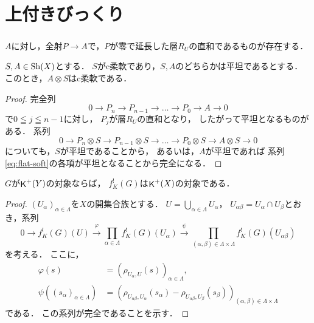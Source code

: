 \section{上付きびっくり}
\subparagraph{\cite[V, 6.1]{B+84}}
\(A\)に対し，全射\(P\to{A}\)で，\(P\)が零で延長した層\(R_U\)の直和であるものが存在する．
\begin{LMM}\cite[{V. Proposition 6.5}]{B+84}
    \(S,A\in\mathrm{Sh}(X)\)とする．
    \(S\)がc柔軟であり，\(S,A\)のどちらかは平坦であるとする．
    このとき，\(A\otimes S\)はc柔軟である．
\end{LMM}
\begin{proof}
    完全列\begin{equation}\label{eq:flat-soft}
        0\to{P_{n}}\to{P_{n-1}}\to\dots\to{P_{0}}\to{A}\to0
    \end{equation}
    で\(0\leqq{j}\leqq{n-1}\)に対し，
    \({P_{j}}\)が層\(R_U\)の直和となり，
    したがって平坦となるものがある．
    系列
    \begin{equation}
        0\to{P_{n}}\otimes{S}\to{P_{n-1}}\otimes{S}
        \to\dots\to{P_{0}}\otimes{S}\to{A}\otimes{S}\to0
    \end{equation}
    についても，\(S\)が平坦であることから，
    あるいは，\(A\)が平坦であれば
    系列\eqref{eq:flat-soft}の各項が平坦となることから完全になる．

\end{proof}

\begin{LMM}\cite[{VI. Th\'eor\`eme 3.5}]{B+84}
    \(G\)が\(\mathop{\mathsf{K}}\nolimits^+(Y)\)の対象ならば，
    \(f^!_K(G)\)は\(\mathop{\mathsf{K}}\nolimits^+(X)\)の対象である．
\end{LMM}
\begin{proof}
    \((U_\alpha)_{\alpha\in{\Lambda}}\)を\(X\)の開集合族とする．
    \(U=\bigcup_{\alpha\in\Lambda}U_\alpha\)，
    \(U_{\alpha\beta}=U_\alpha\cap U_\beta\)とおき，系列
    \[
        0\to f^!_K(G)(U)
        \overset{\varphi}{\longrightarrow}
        \prod_{\alpha\in\Lambda}^{}f^!_K(G)(U_\alpha)
        \overset{\psi}{\longrightarrow}
        \prod_{(\alpha,\beta)\in\Lambda\times\Lambda}f^!_K(G)(U_{\alpha\beta})
    \]
    を考える．
    ここに，\begin{align*}
        \varphi(s)&=\left(\rho_{U_\alpha,U}(s)\right)_{\alpha\in\Lambda},\\
        \psi\left(\left(s_\alpha\right)_{\alpha\in\Lambda}\right)
        &=\left(
            \rho_{U_{\alpha\beta},U_{\alpha}}\left(s_\alpha\right)
            -
            \rho_{U_{\alpha\beta},U_{\beta}}\left(s_\beta\right)
        \right)_{(\alpha,\beta)\in\Lambda\times\Lambda}
    \end{align*}である．
    この系列が完全であることを示す．

\end{proof}


